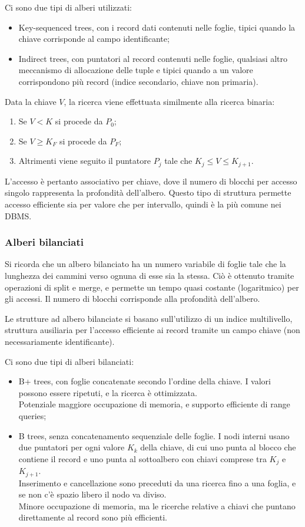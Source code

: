 Ci sono due tipi di alberi utilizzati:
\begin{itemize}
	\item Key-sequenced trees, con i record dati contenuti nelle foglie, tipici quando la chiave corrisponde al campo identificante;
	\item Indirect trees, con puntatori al record contenuti nelle foglie, qualsiasi altro meccanismo di allocazione delle tuple e tipici quando a un valore corrispondono più record (indice secondario, chiave non primaria).
\end{itemize}

Data la chiave $V$, la ricerca viene effettuata similmente alla ricerca binaria:
\begin{enumerate}
	\item Se $V < K$ si procede da $P_0$;
	\item Se $V \geq K_F$ si procede da $P_F$;
	\item Altrimenti viene seguito il puntatore $P_j$ tale che $K_j \leq V \leq K_{j+1}$.
\end{enumerate}

L'accesso è pertanto associativo per chiave, dove il numero di blocchi per accesso singolo rappresenta la profondità dell'albero. Questo tipo di struttura permette accesso efficiente sia per valore che per intervallo, quindi è la più comune nei DBMS.

\subsubsection{Alberi bilanciati}
Si ricorda che un albero bilanciato ha un numero variabile di foglie tale che la lunghezza dei cammini verso ognuna di esse sia la stessa. Ciò è ottenuto tramite operazioni di split e merge, e permette un tempo quasi costante (logaritmico) per gli accessi. Il numero di blocchi corrisponde alla profondità dell'albero.

Le strutture ad albero bilanciate si basano sull'utilizzo di un indice multilivello, struttura ausiliaria per l'accesso efficiente ai record tramite un campo chiave (non necessariamente identificante). 

Ci sono due tipi di alberi bilanciati:
\begin{itemize}
	\item B+ trees, con foglie concatenate secondo l'ordine della chiave. I valori possono essere ripetuti, e la ricerca è ottimizzata. \\
	Potenziale maggiore occupazione di memoria, e supporto efficiente di range queries;
	\item B trees, senza concatenamento sequenziale delle foglie. I nodi interni usano due puntatori per ogni valore $K_k$ della chiave, di cui uno punta al blocco che contiene il record e uno punta al sottoalbero con chiavi comprese tra $K_j$ e $K_{j+1}$. \\
	Inserimento e cancellazione sono preceduti da una ricerca fino a una foglia, e se non c'è spazio libero il nodo va diviso. \\
	Minore occupazione di memoria, ma le ricerche relative a chiavi che puntano direttamente al record sono più efficienti.
\end{itemize}

